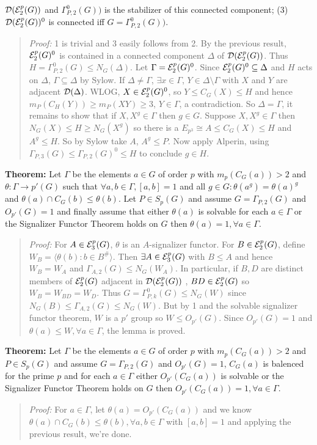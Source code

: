 ${\cal D}({\cal E}_2^p(G))$ and
$\Gamma_{P,2}^0(G))$ is the stabilizer of this connected component;
(3)
${\cal D}({\cal E}_2^p(G))^0$ is connected iff
$G= \Gamma_{P,2}^0(G))$.
\begin{quote}
\emph{Proof:}  1 is trivial and 3 easily follows from 2.   By the previous result,
${\cal E}^p_2(G)^0$ is contained in a connected component $\Delta$ of
${\cal D}({\cal E}^p_2(G))$.  Thus
$H=
\Gamma_{P, 2}^0(G) \le N_G( \Delta )$.
Let $\Gamma= {\cal E}^p_2(G)^0$.
Since ${\cal E}^p_2(G)^0 \subseteq \Delta$ and $H$ acts on $\Delta$,
$\Gamma \subseteq \Delta$ by Sylow.  If $\Delta \ne \Gamma$, $\exists x \in \Gamma$,
$Y \in \Delta \setminus \Gamma$ with $X$ and $Y$ are adjacent
${\cal D}( \Delta )$.   WLOG,
$X \in {\cal E}^p_2(G)^0$, so $Y \le C_G(X) \le H$ and hence
$m_P(C_H(Y)) \ge m_P(XY) \ge 3$, $Y \in \Gamma$, a contradiction.
So $\Delta = \Gamma$, it remains to show that if $X, X^g \in \Gamma$ then $g \in G$.
Suppose
$X, X^g \in \Gamma$ then $N_G(X) \le H \ge N_G(X^g )$ so there is a
$E_{p^3} \cong A \le C_G(X) \le H$ and $A^g \le H$.  So by Sylow take $A$,
$A^g \le P$.  Now apply Alperin, using $ \Gamma_{P, 3}(G) \le \Gamma_{P, 2}(G)^0 \le H $ to conclude $g \in H$.
\end{quote}
{\bf Theorem:} Let $\Gamma$ be the elements $a \in G$ of order $p$ with $m_p(C_G(a)) > 2$ and
$\theta: \Gamma \rightarrow p'(G)$ such that $\forall a,b \in \Gamma, [a,b]=1$ and
all $g \in G: \theta(a^g)=\theta(a)^g$ and $\theta(a) \cap C_G(b) \le \theta(b)$.
Let $P \in S_p(G)$ and assume $G=\Gamma_{P,2}(G)$ and $O_{p'}(G)=1$ and finally assume
that either $\theta(a)$ is solvable for each $a \in \Gamma$ or the Signalizer Functor Theorem
holds on $G$ then $\theta(a)=1, \forall a \in \Gamma$.
\begin{quote}
\emph{Proof:}  For $A \in {\cal E}^p_3(G)$, $\theta$ is an $A$-signalizer functor.  For
$B \in {\cal E}^p_2(G)$, define $W_B= \langle \theta(b): b \in B^{\#} \rangle$.  Then
$\exists A \in {\cal E}^p_3(G)$ with $B \le A$ and hence $W_B = W_A$ and
$\Gamma_{A,2}(G) \le N_G(W_A)$.  In particular, if $B, D$ are distinct members of
${\cal E}^p_2(G)$ adjacent in
${\cal D}({\cal E}^p_2(G))$ , $BD \in
{\cal E}^p_2(G)$ so $W_B = W_{BD} = W_D$.  Thus
$G = \Gamma^0_{P, k}(G) \le N_G(W)$ since
$N_G(B) \le \Gamma_{A,2}(G) \le N_G(W)$.  But by 1 and the solvable signalizer functor theorem,
$W$ is a $p'$ group so $W \le O_{p'}(G)$.  Since $O_{p'}(G) = 1$ and $\theta(a) \le W, \forall a \in \Gamma$, the lemma is proved.
\end{quote}
{\bf Theorem:} Let $\Gamma$ be the elements $a \in G$ of order $p$ with $m_p(C_G(a)) > 2$ and
$P \in S_p(G)$ and assume $G=\Gamma_{P,2}(G)$ and $O_{p'}(G)=1$, $C_G(a)$ is balenced
for the prime $p$ and for each $a \in \Gamma$ either
$O_{p'}(C_G(a))$ is solvable or the Signalizer Functor Theorem holds on $G$ then
$O_{p'}(C_G(a))=1, \forall a \in \Gamma$.
\begin{quote}
\emph{Proof:}  For $a \in \Gamma$, let $\theta(a)= O_{p'}(C_G(a))$ and we know
$\theta(a) \cap C_G(b) \le \theta(b), \forall a, b \in \Gamma$ with $[a,b]= 1$ and applying the
previous result, we're done.
\end{quote}
